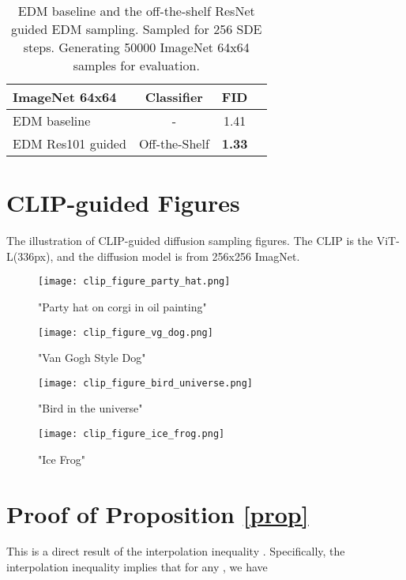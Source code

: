 \documentclass{article}
\theoremstyle{definition}
\begin{document}
\begin{table}[h!]
\caption{EDM baseline and the off-the-shelf ResNet guided EDM sampling. Sampled for 256 SDE steps. Generating 50000 ImageNet 64x64 samples for evaluation.}
\label{table:sde_edm_results}
\begin{center}
\begin{small}
\begin{sc}
\begin{tabular}{lccc}
\toprule
ImageNet 64x64 & Classifier & FID \\ 
\midrule
EDM baseline     & -  & 1.41 \\ 
EDM Res101 guided & Off-the-Shelf & \bf{1.33} \\ 
\bottomrule
\end{tabular}
\end{sc}
\end{small}
\end{center}
\end{table}


\section{CLIP-guided Figures}\label{appendix:clip_figures}
The illustration of CLIP-guided diffusion sampling figures. The CLIP is the ViT-L(336px), and the diffusion model \cite{dhariwal2021diffusion} is from 256x256 ImagNet.





\begin{figure}[h]\label{fig:clip_all_figures}
  \centering
\texttt{[image: clip\_figure\_party\_hat.png]}
  \caption{"Party hat on corgi in oil painting"}
  \label{fig:clip_figure_party_hat}
\texttt{[image: clip\_figure\_vg\_dog.png]}
  \caption{"Van Gogh Style Dog"}
  \label{fig:clip_figure_vg_dog}
\texttt{[image: clip\_figure\_bird\_universe.png]}
  \caption{"Bird in the universe"}
  \label{fig:clip_figure_bird_universe}
\texttt{[image: clip\_figure\_ice\_frog.png]}
  \caption{"Ice Frog"}
  \label{fig:clip_figure_ice_frog}
\end{figure}

\section{Proof of Proposition \ref{prop}}
This is a direct result of the interpolation inequality \citep{BrezisMironescu19}. Specifically, the interpolation inequality implies that for any , we have
\end{document}
